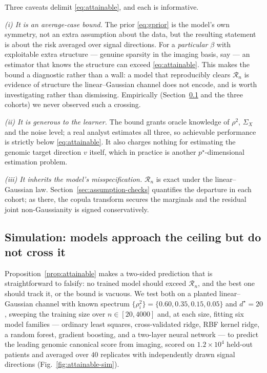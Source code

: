 \documentclass{article}
\newcommand{\Sx}{\Sigma_{X}}
\begin{document}
Three caveats delimit \eqref{eq:attainable}, and each is informative.

\emph{(i) It is an average-case bound.} The prior \eqref{eq:gprior} is the
model's own symmetry, not an extra assumption about the data, but the resulting
statement is about the risk averaged over signal directions. For a
\emph{particular} $\beta$ with exploitable extra structure --- genuine sparsity
in the imaging basis, say --- an estimator that knows the structure can exceed
\eqref{eq:attainable}. This makes the bound a diagnostic rather than a wall: a
model that reproducibly clears $\mathcal{R}_n$ is evidence of structure the
linear--Gaussian channel does not encode, and is worth investigating rather than
dismissing. Empirically (Section~\ref{sec:attainable-sim} and the three cohorts)
we never observed such a crossing.

\emph{(ii) It is generous to the learner.} The bound grants oracle knowledge of
$\rho^2$, $\Sx$ and the noise level; a real analyst estimates all three, so
achievable performance is strictly below \eqref{eq:attainable}. It also charges
nothing for estimating the genomic target direction $v$ itself, which in
practice is another $p^\star$-dimensional estimation problem.

\emph{(iii) It inherits the model's misspecification.} $\mathcal{R}_n$ is exact
under the linear--Gaussian law. Section~\ref{sec:assumption-checks} quantifies
the departure in each cohort; as there, the copula transform secures the
marginals and the residual joint non-Gaussianity is signed conservatively.

\subsection{Simulation: models approach the ceiling but do not cross it}
\label{sec:attainable-sim}

Proposition~\ref{prop:attainable} makes a two-sided prediction that is
straightforward to falsify: no trained model should exceed $\mathcal{R}_n$, and
the best one should track it, or the bound is vacuous. We test both on a planted
linear--Gaussian channel with known spectrum
$\{\rho_i^2\}=\{0.60,0.35,0.15,0.05\}$ and $d^\star=20$, sweeping the training
size over $n\in[20,4000]$ and, at each size, fitting six model families ---
ordinary least squares, cross-validated ridge, RBF kernel ridge, a random
forest, gradient boosting, and a two-layer neural network --- to predict the
leading genomic canonical score from imaging, scored on $1.2\times10^4$ held-out
patients and averaged over $40$ replicates with independently drawn signal
directions (Fig.~\ref{fig:attainable-sim}).
\end{document}
